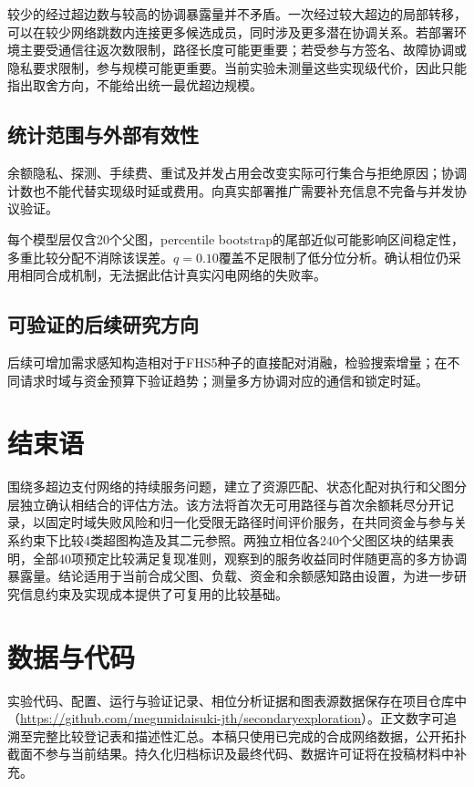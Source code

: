 \documentclass[UTF8,a4paper,twocolumn,fontset=none,zihao=5]{ctexart}
\begin{document}
较少的经过超边数与较高的协调暴露量并不矛盾。一次经过较大超边的局部转移，可以在较少网络跳数内连接更多候选成员，同时涉及更多潜在协调关系。若部署环境主要受通信往返次数限制，路径长度可能更重要；若受参与方签名、故障协调或隐私要求限制，参与规模可能更重要。当前实验未测量这些实现级代价，因此只能指出取舍方向，不能给出统一最优超边规模。


\subsection{统计范围与外部有效性}

余额隐私、探测、手续费、重试及并发占用会改变实际可行集合与拒绝原因；协调计数也不能代替实现级时延或费用。向真实部署推广需要补充信息不完备与并发协议验证。


每个模型层仅含20个父图，percentile bootstrap的尾部近似可能影响区间稳定性，多重比较分配不消除该误差。$q=0.10$覆盖不足限制了低分位分析。确认相位仍采用相同合成机制，无法据此估计真实闪电网络的失败率。


\subsection{可验证的后续研究方向}

后续可增加需求感知构造相对于FHS5种子的直接配对消融，检验搜索增量；在不同请求时域与资金预算下验证趋势；测量多方协调对应的通信和锁定时延。


\section{结束语}

围绕多超边支付网络的持续服务问题，建立了资源匹配、状态化配对执行和父图分层独立确认相结合的评估方法。该方法将首次无可用路径与首次余额耗尽分开记录，以固定时域失败风险和归一化受限无路径时间评价服务，在共同资金与参与关系约束下比较4类超图构造及其二元参照。两独立相位各240个父图区块的结果表明，全部40项预定比较满足复现准则，观察到的服务收益同时伴随更高的多方协调暴露量。结论适用于当前合成父图、负载、资金和余额感知路由设置，为进一步研究信息约束及实现成本提供了可复用的比较基础。


\section*{数据与代码}

实验代码、配置、运行与验证记录、相位分析证据和图表源数据保存在项目仓库中（\url{https://github.com/megumidaisuki-jth/secondaryexploration}）。正文数字可追溯至完整比较登记表和描述性汇总。本稿只使用已完成的合成网络数据，公开拓扑截面不参与当前结果。持久化归档标识及最终代码、数据许可证将在投稿材料中补充。
\end{document}
